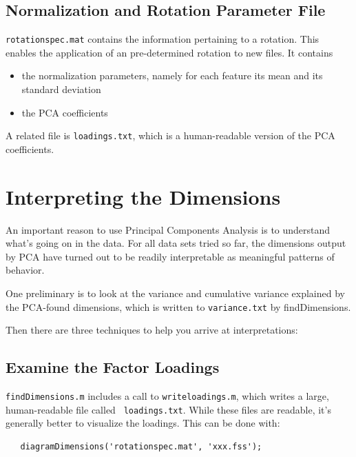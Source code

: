 \documentclass[11pt]{article}
\begin{document}
\subsection{Normalization and Rotation Parameter File}

{\tt rotationspec.mat}  contains the information pertaining to a
rotation.  This enables the application of an pre-determined rotation 
to new files.  It contains 

\begin{itemize}  \setlength{\itemsep}{0pt}\setlength{\parskip}{0pt}
\item the normalization parameters, namely for each feature its mean
  and its standard deviation

\item the PCA coefficients
\end{itemize}

A related file is {\tt loadings.txt}, which is a human-readable
version of the PCA coefficients.


\section{Interpreting the Dimensions}  \label{sec:interpreting}

An important reason to use Principal Components Analysis is to
understand what's going on in the data.  For all data sets tried so
far, the dimensions output by PCA have turned out to be readily
interpretable as meaningful patterns of behavior.  

One preliminary is
to look at the variance and cumulative variance explained by the
PCA-found dimensions, which is written to {\tt variance.txt} by
findDimensions. 

Then there are three techniques to help you arrive at
interpretations:


\subsection{Examine the Factor Loadings}

{\tt findDimensions.m} includes a call to {\tt writeloadings.m}, which
writes a large, human-readable file called {\tt
  loadings.txt}.  While these files are readable, it's generally better
to visualize the loadings.  This can be done with:

\begin{verbatim}
   diagramDimensions('rotationspec.mat', 'xxx.fss');
\end{verbatim}
\end{document}
